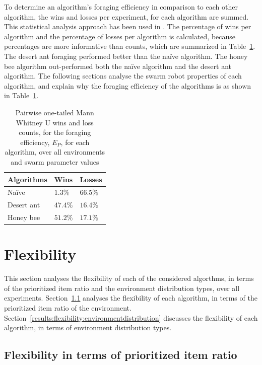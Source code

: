 To determine an algorithm's foraging efficiency in comparison to each other algorithm, the wins and losses per experiment, for each algorithm are summed. This statistical analysis approach has been used in \cite{helbig2013performance}. The percentage of wins per algorithm and the percentage of losses per algorithm is calculated, because percentages are more informative than counts, which are summarized in Table~\ref{summarytable}. The desert ant foraging performed better than the na\"ive algorithm. The honey bee algorithm out-performed both the na\"ive algorithm and the desert ant algorithm. The following sections analyse the swarm robot properties of each algorithm, and explain why the foraging efficiency of the algorithms is as shown in Table~\ref{summarytable}.


\begin{table}[!htbp]
    \centering
    \caption{Pairwise one-tailed Mann Whitney U wins and loss counts, for the foraging efficiency, $E_P$, for each algorithm, over all environments and swarm parameter values }
    \label{summarytable}
    \begin{tabular}{@{}lll@{}}
    \toprule
    \textbf{Algorithms} & \textbf{Wins} & \textbf{Losses} \\ \midrule
    Na\"ive               & $1.3\%$          & $66.5\%$           \\
    Desert ant          & $47.4\%$         & $16.4\%$           \\
    Honey bee           & $51.2\%$         & $17.1\%$          \\ \bottomrule
    \end{tabular}
\end{table}


\section{Flexibility}
\label{results:flexibility}

This section analyses the flexibility of each of the considered algorthms, in terms of the prioritized item ratio and the environment distribution types, over all experiments. Section~\ref{results:prioritizeditemratio} analyses the flexibility of each algorithm, in terms of the prioritized item ratio of the environment. Section~\ref{results:flexibility:environmentdistribution} discusses the flexibility of each algorithm, in terms of environment distribution types.
\subsection{Flexibility in terms of prioritized item ratio}
\label{results:prioritizeditemratio}

